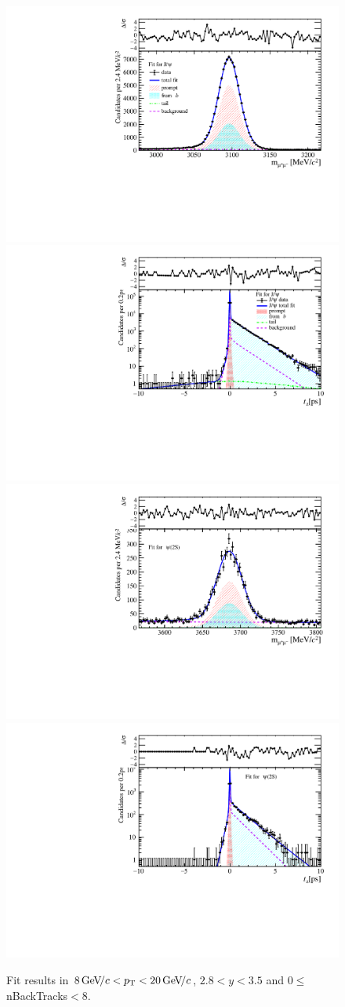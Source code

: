 \begin{figure}[H]
\begin{center}
\includegraphics[width=0.47\linewidth]{pdf/Jpsi/drawmassB/n1y2pt5.pdf}
\includegraphics[width=0.47\linewidth]{pdf/Jpsi/2DFitB/n1y2pt5.pdf}
\vspace*{-0.5cm}
\includegraphics[width=0.47\linewidth]{pdf/Psi2S/drawmassB/n1y2pt5.pdf}
\includegraphics[width=0.47\linewidth]{pdf/Psi2S/2DFitB/n1y2pt5.pdf}
\vspace*{-0.5cm}
\end{center}
\caption{Fit results in $8\text{\,Ge\kern -0.1em V\!/}c<p_{\mathrm{T}}<20\text{\,Ge\kern -0.1em V\!/}c$, $2.8<y<3.5$ and 0$\leq$nBackTracks$<$8.}
\label{Fitn1y2pt5}
\end{figure}
